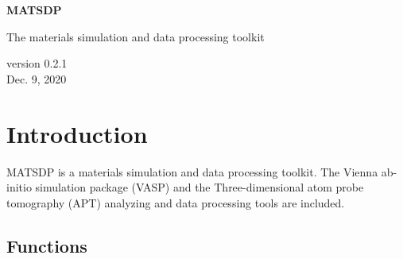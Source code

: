 \documentclass[12pt]{book}
\begin{document}

\begin{titlepage}
\begin{center}
\vspace*{1cm}

\Huge
\textbf{MATSDP}

\vspace{0.5cm}
\LARGE The materials simulation and data processing toolkit
\vspace{1.5cm}

\vfill

\vspace{0.8cm}

\small version 0.2.1\\
\small Dec. 9, 2020

\end{center}
\end{titlepage}

\tableofcontents

\chapter{Introduction}
MATSDP is a materials simulation and data processing toolkit. The Vienna ab-initio simulation package (VASP) and the Three-dimensional atom probe tomography (APT) analyzing and data processing tools are included. 

\section{Functions}
\end{document}
